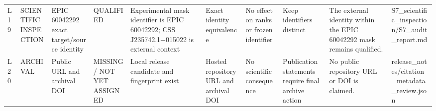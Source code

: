 \begin{longtable}{llllllllll}
L19 & SCIENTIFIC INSPECTION & EPIC 60042292 exact target/source identity & QUALIFIED & Experimental mask identifier is EPIC 60042292; CSS J235742.1−015022 is external context & Exact identity equivalence & No effect on ranks or frozen identifier & Keep identifiers distinct & The external identity within the EPIC 60042292 mask remains qualified. & S7\_scientific\_inspection/S7\_audit\_report.md \\
L20 & ARCHIVAL & Public URL and archival DOI & MISSING / NOT YET ASSIGNED & Local release candidate and fingerprint exist & Hosted repository URL and archival DOI & No scientific consequence & Publication statements require final archive action & No public repository URL or DOI is claimed. & release\_notes/citation\_metadata\_review.json \\
\bottomrule
\end{longtable}
